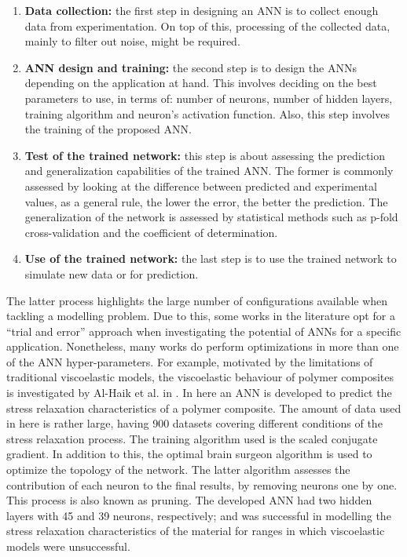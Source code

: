 \begin{enumerate}
    \item \textbf{Data collection:} the first step in designing an ANN is to collect enough data from experimentation. On top of this, processing of the collected data, mainly to filter out noise, might be required.
    \item \textbf{ANN design and training:} the second step is to design the ANNs depending on the application at hand. This involves deciding on the best parameters to use, in terms of: number of neurons, number of hidden layers, training algorithm and neuron's activation function. Also, this step involves the training of the proposed ANN.
    \item \textbf{Test of the trained network:} this step is about assessing the prediction and generalization capabilities of the trained ANN. The former is commonly assessed by looking at the difference between predicted and experimental values, as a general rule, the lower the error, the better the prediction. The generalization of the network is assessed by statistical methods such as p-fold cross-validation and the coefficient of determination.
    \item \textbf{Use of the trained network:} the last step is to use the trained network to simulate new data or for prediction.
\end{enumerate}

The latter process highlights the large number of configurations available when tackling a modelling problem. Due to this, some works in the literature opt for a ``trial and error'' approach when investigating the potential of ANNs for a specific application. Nonetheless, many works do perform optimizations in more than one of the ANN hyper-parameters. For example, motivated by the limitations of traditional viscoelastic models, the viscoelastic behaviour of polymer composites is investigated by Al-Haik et al. in \cite{al2006prediction}. In here an ANN is developed to predict the stress relaxation characteristics of a polymer composite. The amount of data used in here is rather large, having 900 datasets covering different conditions of the stress relaxation process. The training algorithm used is the scaled conjugate gradient. In addition to this, the optimal brain surgeon algorithm is used to optimize the topology of the network. The latter algorithm assesses the contribution of each neuron to the final results, by removing neurons one by one. This process is also known as pruning. The developed ANN had two hidden layers with 45 and 39 neurons, respectively; and was successful in modelling the stress relaxation characteristics of the material for ranges in which viscoelastic models were unsuccessful.

